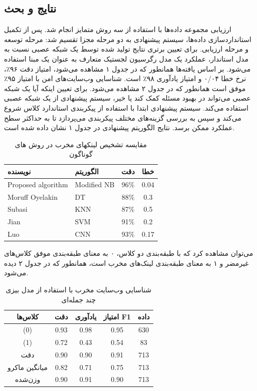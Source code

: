 \documentclass{CSICC2020}
\begin{document}
	\subsection{نتایج و بحث}
	ارزیابی مجموعه داده‌ها با استفاده از سه روش متمایز انجام شد. پس از تکمیل استانداردسازی داده‌ها، سیستم پیشنهادی به دو مرحله مجزا تقسیم شد: مرحله توسعه و مرحله ارزیابی. برای تعیین برتری نتایج تولید شده توسط یک شبکه عصبی نسبت به مدل استاندار، عملکرد یک مدل رگرسیون لجستیک متعارف به عنوان یک مبنا استفاده می‌شود. بر اساس یافته‌ها همانطور که در جدول ۱ مشاهده می‌شود، امتیاز دقت ۹۶٪، نرخ خطا ۰/۰۴ و امتیاز یادآوری ۹۸٪ است. شناسایی وب‌سایت‌های امن با امتیاز ۹۵٪ موفق است همانطور که در جدول ۲ مشاهده می‌شود. برای تعیین اینکه آیا یک شبکه عصبی می‌تواند در بهبود مسئله کمک کند یا خیر، سیستم پیشنهادی از یک شبکه عصبی استفاده می‌کند. سیستم پیشنهادی ابتدا با استفاده از پیکربندی استاندارد کلاس  شروع می‌کند و سپس به بررسی گزینه‌های مختلف پیکربندی می‌پردازد تا به حداکثر سطح عملکرد ممکن برسد. نتایج الگوریتم پیشنهادی در جدول ۱ نشان داده شده است.
	\begin{table}[H]
		\centering
		\caption{مقایسه تشخیص لینکهای مخرب در روش های گوناگون }
		\begin{tabular}{|l|l|c|c|}
			\hline
			نویسنده & الگوریتم & دقت & خطا \\
			\hline
			Proposed algorithm & Modified NB & 96\% & 0.04 \\
			Moruff Oyelakin \cite{oyelakin2023performance} & DT & 88\% & 0.3 \\
			Subasi \cite{subasi2021comparative} & KNN & 87\% & 0.5 \\
			Jian \cite{jian2016design} & SVM & 91\% & 0.2 \\
			Luo \cite{chen2021malicious} & CNN & 93\% & 0.17 \\
			\hline
		\end{tabular}
	\end{table}
	می‌توان مشاهده کرد که با طبقه‌بندی دو کلاس، ۰ به معنای طبقه‌بندی موفق کلاس‌های غیرمضر و ۱ به معنای طبقه‌بندی لینک‌های مخرب است، همانطور که در جدول ۲ دیده می‌شود.
	\begin{table}[H]
		
		\centering
		\label{tab:t}
		\caption{شناسایی وب‌سایت مخرب با استفاده از مدل بیزی چند جمله‌ای}
		\begin{tabular}{|c|c|c|c|c|}
			\hline
			کلاس‌ها & دقت & یادآوری & امتیاز F1 & داده \\
			\hline
			(0) & 0.93 & 0.98 & 0.95 & 630 \\
			(1) & 0.72 & 0.43 & 0.54 & 83 \\
			دقت & 0.90 & 0.90 & 0.91 & 713 \\
			میانگین ماکرو & 0.82 & 0.71 & 0.75 & 713 \\
			وزن‌شده & 0.90 & 0.91 & 0.90 & 713 \\
			\hline
		\end{tabular}
	\end{table}
	
\end{document}
